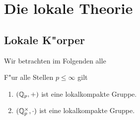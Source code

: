 \section{Die lokale Theorie}
\subsection{Lokale K"orper}
	Wir betrachten im Folgenden alle 
	\begin{satz}\label{satz:QpIstLokalKompakt}
		F"ur alle Stellen $p\leq\infty$ gilt
		\begin{enumerate}[label=(\roman*)]
		\item $({\mathbb{Q}_p}, +)$ ist eine lokalkompakte Gruppe.
		\item $(\mathbb{Q}_p^\times, \cdot)$ ist eine lokalkompakte Gruppe.
		\end{enumerate}
	\end{satz}
